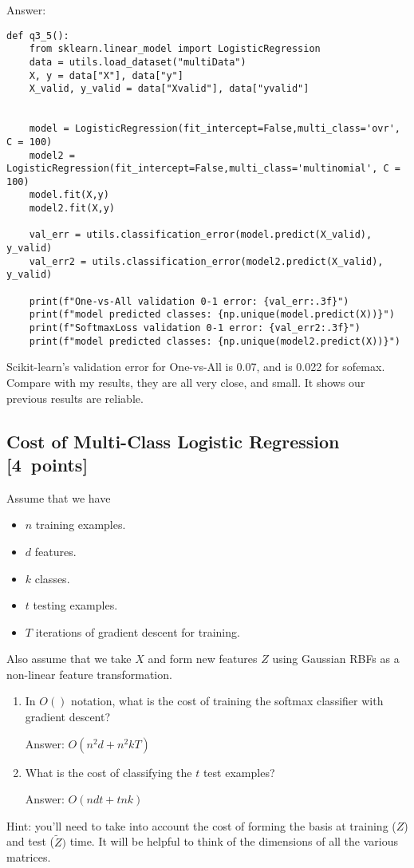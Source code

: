 \documentclass{article}
\newcommand{\blu}[1]{{\textcolor{blu}{#1}}}
\newenvironment{answer}{\par\begingroup\color{gre}Answer: }{\endgroup}
\let\ask\blu
\newcommand\pts[1]{\textcolor{pointscolour}{[#1~points]}}
\begin{document}
\begin{answer}
    \begin{verbatim}
def q3_5():
    from sklearn.linear_model import LogisticRegression
    data = utils.load_dataset("multiData")
    X, y = data["X"], data["y"]
    X_valid, y_valid = data["Xvalid"], data["yvalid"]

   
    model = LogisticRegression(fit_intercept=False,multi_class='ovr', C = 100)
    model2 = LogisticRegression(fit_intercept=False,multi_class='multinomial', C = 100)
    model.fit(X,y)
    model2.fit(X,y)

    val_err = utils.classification_error(model.predict(X_valid), y_valid)
    val_err2 = utils.classification_error(model2.predict(X_valid), y_valid)
    
    print(f"One-vs-All validation 0-1 error: {val_err:.3f}")
    print(f"model predicted classes: {np.unique(model.predict(X))}")
    print(f"SoftmaxLoss validation 0-1 error: {val_err2:.3f}")
    print(f"model predicted classes: {np.unique(model2.predict(X))}")
    \end{verbatim}
    Scikit-learn's validation error for One-vs-All is 0.07, and is 0.022 for sofemax. Compare with my results, they are all very close, and small. It shows our previous results are reliable.
\end{answer}
\subsection{Cost of Multi-Class Logistic Regression \pts{4}}

Assume that we have
\begin{itemize}
    \item $n$ training examples.
    \item $d$ features.
    \item $k$ classes.
    \item $t$ testing examples.
    \item $T$ iterations of gradient descent for training.
\end{itemize}
Also assume that we take $X$ and form new features $Z$ using Gaussian RBFs as a non-linear feature transformation.
\begin{enumerate}
\item \ask{In $O()$ notation, what is the cost of training the softmax classifier with gradient descent?}
\begin{answer}
    $O(n^2d + n^2kT)$
\end{answer}
\item \ask{What is the cost of classifying the $t$ test examples?}
\begin{answer}
    $O(ndt + tnk)$
\end{answer}
\end{enumerate}
Hint: you'll need to take into account the cost of forming the basis at training ($Z$) and test ($\tilde{Z})$ time. It will be helpful to think of the dimensions of all the various matrices.
\end{document}
